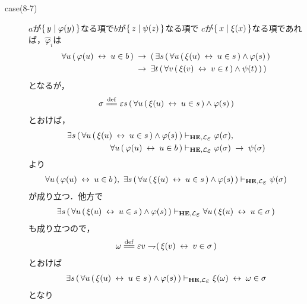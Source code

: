 \begin{metaprf}
\begin{description}
\begin{description}
					\item[case(8-7)] $a$が$\{\, y \mid \varphi(y)\, \}$なる項で$b$が$\{\, z \mid \psi(z)\, \}$なる項で
						$c$が$\{\, x \mid \xi(x)\, \}$なる項であれば，$\widehat{\varphi}_{i}$は
						\begin{align}
							\forall u\, (\, \varphi(u) \hspace{0.25em}\leftrightarrow\hspace{0.25em} u \in b\, ) 
							&\hspace{0.25em}\rightarrow\hspace{0.25em} (\, \exists s\, (\, \forall u\, (\, \xi(u) \hspace{0.25em}\leftrightarrow\hspace{0.25em} u \in s\, ) \wedge \varphi(s)\, ) \\
							&\hspace{0.25em}\rightarrow\hspace{0.25em} \exists t\, (\, \forall v\, (\, \xi(v) \hspace{0.25em}\leftrightarrow\hspace{0.25em} v \in t\, ) \wedge \psi(t)\, )\, )
						\end{align}
						となるが，
						\begin{align}
							\sigma \defeq \varepsilon s\, (\, \forall u\, (\, \xi(u) \lrarrow u \in s\, ) \wedge \varphi(s)\, )
						\end{align}
						とおけば，
						\begin{align}
							\exists s\, (\, \forall u\, (\, \xi(u) \lrarrow u \in s\, ) \wedge \varphi(s)\, ) 
							&\provable{\mbox{{\bf HE}},\lang{\varepsilon}} \varphi(\sigma), \\
							\forall u\, (\, \varphi(u) \lrarrow u \in b\, )
							&\provable{\mbox{{\bf HE}},\lang{\varepsilon}} \varphi(\sigma) \rarrow \psi(\sigma)
						\end{align}
						より
						\begin{align}
							\forall u\, (\, \varphi(u) \lrarrow u \in b\, ),\ 
							\exists s\, (\, \forall u\, (\, \xi(u) \lrarrow u \in s\, ) \wedge \varphi(s)\, ) 
							\provable{\mbox{{\bf HE}},\lang{\varepsilon}} \psi(\sigma)
						\end{align}
						が成り立つ．他方で
						\begin{align}
							\exists s\, (\, \forall u\, (\, \xi(u) \lrarrow u \in s\, ) \wedge \varphi(s)\, ) 
							\provable{\mbox{{\bf HE}},\lang{\varepsilon}} \forall u\, (\, \xi(u) \lrarrow u \in \sigma\, )
						\end{align}
						も成り立つので，
						\begin{align}
							\omega \defeq \varepsilon v \negation (\, \xi(v) \lrarrow v \in \sigma\, )
						\end{align}
						とおけば
						\begin{align}
							\exists s\, (\, \forall u\, (\, \xi(u) \lrarrow u \in s\, ) \wedge \varphi(s)\, ) 
							\provable{\mbox{{\bf HE}},\lang{\varepsilon}} \xi(\omega) \lrarrow \omega \in \sigma
						\end{align}
						となり
						\begin{align}

\end{align}
\end{description}
\end{description}
\end{metaprf}
